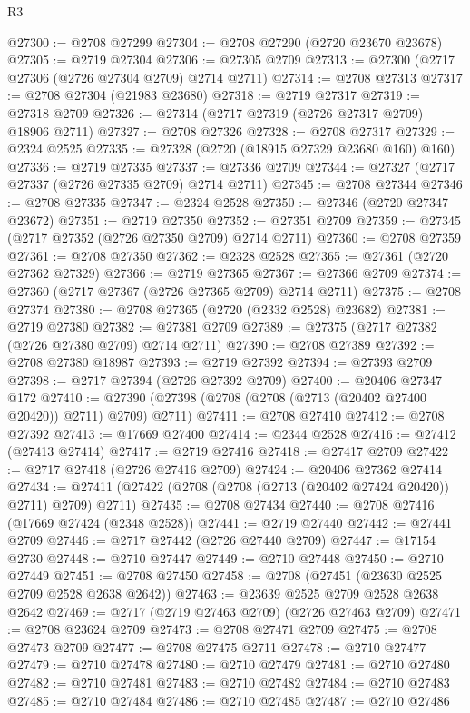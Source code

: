 \begin{lexlean}{R3}
\begin{coremodule}
@27300 := @2708 @27299
@27304 := @2708 @27290 (@2720 @23670 @23678)
@27305 := @2719 @27304
@27306 := @27305 @2709
@27313 := @27300 (@2717 @27306 (@2726 @27304 @2709) @2714 @2711)
@27314 := @2708 @27313
@27317 := @2708 @27304 (@21983 @23680)
@27318 := @2719 @27317
@27319 := @27318 @2709
@27326 := @27314 (@2717 @27319 (@2726 @27317 @2709) @18906 @2711)
@27327 := @2708 @27326
@27328 := @2708 @27317
@27329 := @2324 @2525
@27335 := @27328 (@2720 (@18915 @27329 @23680 @160) @160)
@27336 := @2719 @27335
@27337 := @27336 @2709
@27344 := @27327 (@2717 @27337 (@2726 @27335 @2709) @2714 @2711)
@27345 := @2708 @27344
@27346 := @2708 @27335
@27347 := @2324 @2528
@27350 := @27346 (@2720 @27347 @23672)
@27351 := @2719 @27350
@27352 := @27351 @2709
@27359 := @27345 (@2717 @27352 (@2726 @27350 @2709) @2714 @2711)
@27360 := @2708 @27359
@27361 := @2708 @27350
@27362 := @2328 @2528
@27365 := @27361 (@2720 @27362 @27329)
@27366 := @2719 @27365
@27367 := @27366 @2709
@27374 := @27360 (@2717 @27367 (@2726 @27365 @2709) @2714 @2711)
@27375 := @2708 @27374
@27380 := @2708 @27365 (@2720 (@2332 @2528) @23682)
@27381 := @2719 @27380
@27382 := @27381 @2709
@27389 := @27375 (@2717 @27382 (@2726 @27380 @2709) @2714 @2711)
@27390 := @2708 @27389
@27392 := @2708 @27380 @18987
@27393 := @2719 @27392
@27394 := @27393 @2709
@27398 := @2717 @27394 (@2726 @27392 @2709)
@27400 := @20406 @27347 @172
@27410 := @27390 (@27398 (@2708 (@2708 (@2713 (@20402 @27400 @20420)) @2711) @2709) @2711)
@27411 := @2708 @27410
@27412 := @2708 @27392
@27413 := @17669 @27400
@27414 := @2344 @2528
@27416 := @27412 (@27413 @27414)
@27417 := @2719 @27416
@27418 := @27417 @2709
@27422 := @2717 @27418 (@2726 @27416 @2709)
@27424 := @20406 @27362 @27414
@27434 := @27411 (@27422 (@2708 (@2708 (@2713 (@20402 @27424 @20420)) @2711) @2709) @2711)
@27435 := @2708 @27434
@27440 := @2708 @27416 (@17669 @27424 (@2348 @2528))
@27441 := @2719 @27440
@27442 := @27441 @2709
@27446 := @2717 @27442 (@2726 @27440 @2709)
@27447 := @17154 @2730
@27448 := @2710 @27447
@27449 := @2710 @27448
@27450 := @2710 @27449
@27451 := @2708 @27450
@27458 := @2708 (@27451 (@23630 @2525 @2709 @2528 @2638 @2642))
@27463 := @23639 @2525 @2709 @2528 @2638 @2642
@27469 := @2717 (@2719 @27463 @2709) (@2726 @27463 @2709)
@27471 := @2708 @23624 @2709
@27473 := @2708 @27471 @2709
@27475 := @2708 @27473 @2709
@27477 := @2708 @27475 @2711
@27478 := @2710 @27477
@27479 := @2710 @27478
@27480 := @2710 @27479
@27481 := @2710 @27480
@27482 := @2710 @27481
@27483 := @2710 @27482
@27484 := @2710 @27483
@27485 := @2710 @27484
@27486 := @2710 @27485
@27487 := @2710 @27486

\end{coremodule}
\end{lexlean}
